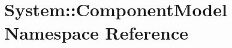 \section{System::Component\-Model Namespace Reference}
\label{namespace_system_1_1_component_model}


